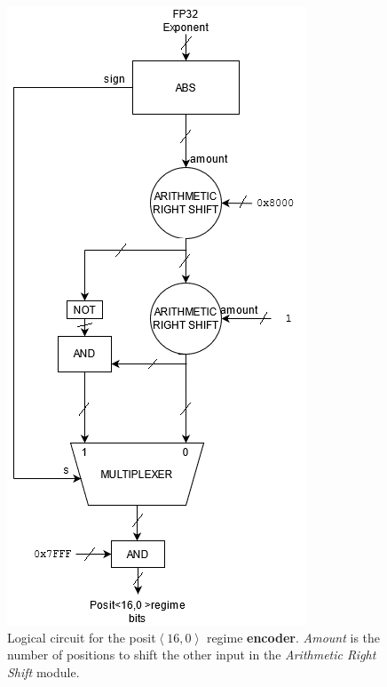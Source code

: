\begin{figure}
    \centering
    \includegraphics[width=0.5\linewidth]{img/regime_encoder.png}
    \caption{Logical circuit for the posit$\left<16,0\right>$ regime \textbf{encoder}. \textit{Amount} is the number of positions to shift the other input in the \textit{Arithmetic Right Shift} module.}
    \label{fig:fp_exp_reg_encoder}
\end{figure}



